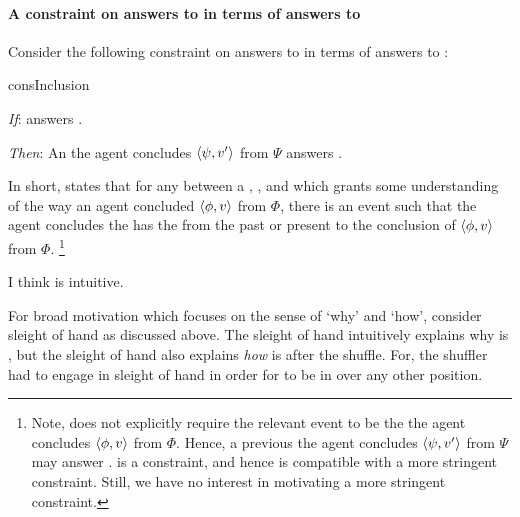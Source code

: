 \paragraph*{A constraint on answers to \qWhy{} in terms of answers to \qHow{}}


\begin{note}
  Consider the following constraint on answers to \qWhy{} in terms of answers to \qHow{}:

  \begin{constraint}{consInclusion}{\issueInclusion{}}
    \mbox{ }
    \vspace{-\baselineskip}
    \begin{itenum}
    \item[\emph{If}:]
       answers \qWhy{}.
    \item[\emph{Then}:]
      An  the agent concludes \(\langle\psi, v'\rangle\) from \(\Psi\) answers \qHow{}.
    \end{itenum}
    \vspace{-\baselineskip}
  \end{constraint}

  \noindent%
  In short, \issueInclusion{} states that for any \fingfr{} between a , , and \pool{} which grants some understanding of the way an agent concluded \(\langle\phi, v\rangle\) from \(\Phi\), there is an event such that the agent concludes the \prop{} has the \val{} from the \pool{} past or present to the \agents{} conclusion of \(\langle\phi, v\rangle\) from \(\Phi\).%
  \footnote{
    Note, \qHow{} does not explicitly require the relevant event to be the  the agent concludes \(\langle\phi, v\rangle\) from \(\Phi\).
    Hence, a previous  the agent concludes \(\langle\psi, v'\rangle\) from \(\Psi\) may answer \qHow{}.
    \issueInclusion{} is a constraint, and hence is compatible with a more stringent constraint.
    Still, we have no interest in motivating a more stringent constraint.
  }
\end{note}


\begin{note}
  I think \issueInclusion{} is intuitive.
\end{note}


\begin{note}
  For broad motivation which focuses on the sense of `why' and `how', consider sleight of hand as discussed above.
  The sleight of hand intuitively explains why \mainCard{} is \mainCardPos{}, but the sleight of hand also explains \emph{how} \mainCard{} is \mainCardPos{} after the shuffle.
  For, the shuffler had to engage in sleight of hand in order for \mainCard{} to be in \mainCardPos{} over any other position.
\end{note}


